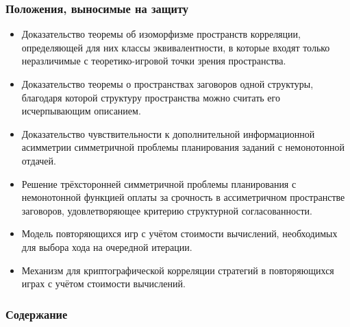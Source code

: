 \begin{frame}
    \setcounter{framenumber}{1}
    \maketitle
\end{frame}

\begin{frame}
    \frametitle{Положения, выносимые на защиту}
    \begin{itemize}
		\item Доказательство теоремы об изоморфизме пространств корреляции, определяющей для них классы эквивалентности, в которые входят только неразличимые с теоретико-игровой точки зрения пространства.
		\item Доказательство теоремы о пространствах заговоров одной структуры, благодаря которой структуру пространства можно считать его исчерпывающим описанием.
		\item Доказательство чувствительности к дополнительной информационной асимметрии симметричной проблемы планирования заданий с немонотонной отдачей.
		\item Решение трёхсторонней симметричной проблемы планирования с немонотонной функцией оплаты за срочность в ассиметричном пространстве заговоров, удовлетворяющее критерию структурной согласованности.
		\item Модель повторяющихся игр с учётом стоимости вычислений, необходимых для выбора хода на очередной итерации.
		\item Механизм для криптографической корреляции стратегий в повторяющихся играх с учётом стоимости вычислений.
    \end{itemize}
\end{frame}

\begin{frame}
    \frametitle{Содержание}
    \tableofcontents
\end{frame}
